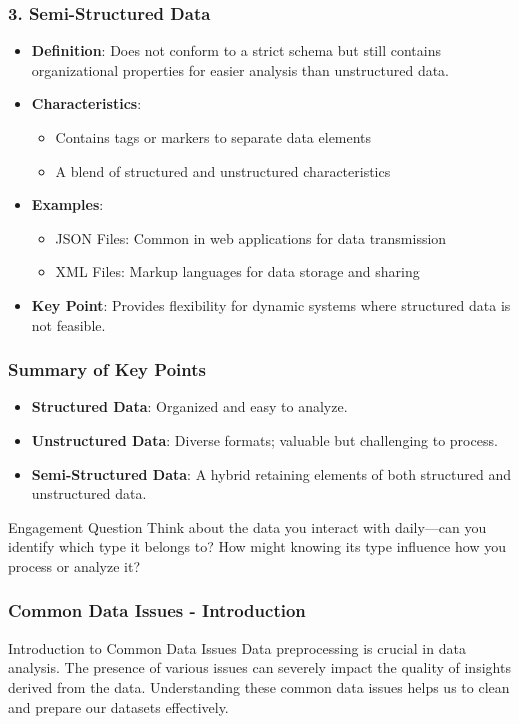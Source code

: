 \documentclass[aspectratio=169]{beamer}
\begin{document}
\begin{frame}[fragile]
    \frametitle{3. Semi-Structured Data}
    \begin{itemize}
        \item \textbf{Definition}: Does not conform to a strict schema but still contains organizational properties for easier analysis than unstructured data.
        \item \textbf{Characteristics}:
            \begin{itemize}
                \item Contains tags or markers to separate data elements
                \item A blend of structured and unstructured characteristics
            \end{itemize}
        \item \textbf{Examples}:
            \begin{itemize}
                \item JSON Files: Common in web applications for data transmission
                \item XML Files: Markup languages for data storage and sharing
            \end{itemize}
        \item \textbf{Key Point}: Provides flexibility for dynamic systems where structured data is not feasible.
    \end{itemize}
\end{frame}

\begin{frame}[fragile]
    \frametitle{Summary of Key Points}
    \begin{itemize}
        \item \textbf{Structured Data}: Organized and easy to analyze.
        \item \textbf{Unstructured Data}: Diverse formats; valuable but challenging to process.
        \item \textbf{Semi-Structured Data}: A hybrid retaining elements of both structured and unstructured data.
    \end{itemize}
    \begin{block}{Engagement Question}
        Think about the data you interact with daily—can you identify which type it belongs to? 
        How might knowing its type influence how you process or analyze it?
    \end{block}
\end{frame}

\begin{frame}[fragile]
    \frametitle{Common Data Issues - Introduction}
    \begin{block}{Introduction to Common Data Issues}
        Data preprocessing is crucial in data analysis. The presence of various issues can severely impact the quality of insights derived from the data. Understanding these common data issues helps us to clean and prepare our datasets effectively.
    \end{block}
\end{frame}
\end{document}
